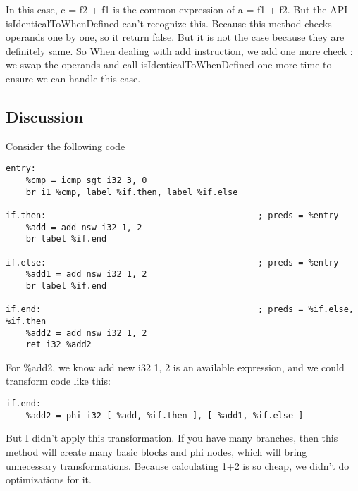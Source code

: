 In this case, c = f2 + f1 is the common expression of a = f1 + f2. But the API isIdenticalToWhenDefined can't recognize this. Because this method checks operands one by one, so it return false. But it is not the case because they are definitely same. So When dealing with add instruction, we add one more check : we swap the operands and call isIdenticalToWhenDefined one more time to ensure we can handle this case.

\subsection{Discussion}
Consider the following code
\begin{verbatim}
entry:
    %cmp = icmp sgt i32 3, 0
    br i1 %cmp, label %if.then, label %if.else

if.then:                                          ; preds = %entry
    %add = add nsw i32 1, 2
    br label %if.end

if.else:                                          ; preds = %entry
    %add1 = add nsw i32 1, 2
    br label %if.end

if.end:                                           ; preds = %if.else, %if.then
    %add2 = add nsw i32 1, 2
    ret i32 %add2
\end{verbatim}
For \%add2, we know add new i32 1, 2 is an available expression, and we could transform code like this:
\begin{verbatim}
if.end:
    %add2 = phi i32 [ %add, %if.then ], [ %add1, %if.else ]
\end{verbatim}
But I didn't apply this transformation. If you have many branches, then this method will create many basic blocks and phi nodes, which will bring unnecessary transformations. Because calculating 1+2 is so cheap, we didn't do optimizations for it.